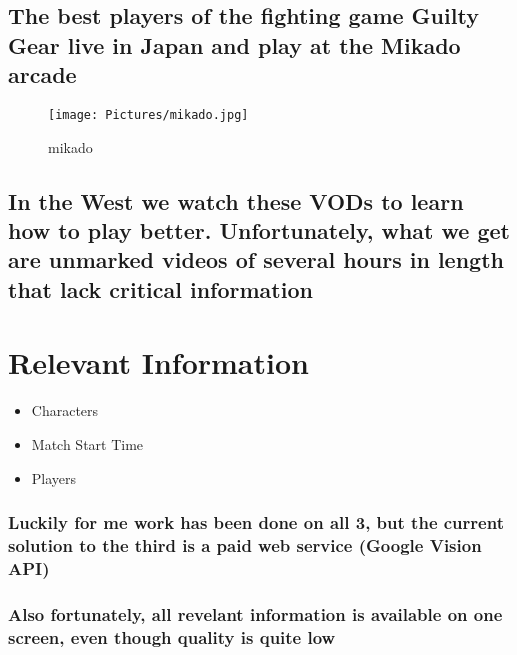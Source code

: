 \documentclass[11pt]{article}
\makeatletter
\def\maxwidth{\ifdim\Gin@nat@width>\linewidth\linewidth
    \else\Gin@nat@width\fi}
\let\Oldincludegraphics\includegraphics
\renewcommand{\includegraphics}[1]{\Oldincludegraphics[width=.8\maxwidth]{#1}}
\providecommand{\tightlist}{%
      \setlength{\itemsep}{0pt}\setlength{\parskip}{0pt}}
\makeatother
\begin{document}
\subsection{The best players of the fighting game Guilty Gear live in
Japan and play at the Mikado
arcade}\label{the-best-players-of-the-fighting-game-guilty-gear-live-in-japan-and-play-at-the-mikado-arcade}

\begin{figure}
\centering
\texttt{[image: Pictures/mikado.jpg]}
\caption{mikado}
\end{figure}

\subsection{In the West we watch these VODs to learn how to play better.
Unfortunately, what we get are unmarked videos of several hours in
length that lack critical
information}\label{in-the-west-we-watch-these-vods-to-learn-how-to-play-better.-unfortunately-what-we-get-are-unmarked-videos-of-several-hours-in-length-that-lack-critical-information}

    \section{Relevant Information}\label{relevant-information}

\begin{itemize}
\tightlist
\item
  Characters
\item
  Match Start Time
\item
  Players
\end{itemize}

\subsubsection{Luckily for me work has been done on all 3, but the
current solution to the third is a paid web service (Google Vision
API)}\label{luckily-for-me-work-has-been-done-on-all-3-but-the-current-solution-to-the-third-is-a-paid-web-service-google-vision-api}

\subsubsection{Also fortunately, all revelant information is available
on one screen, even though quality is quite
low}\label{also-fortunately-all-revelant-information-is-available-on-one-screen-even-though-quality-is-quite-low}
\end{document}
